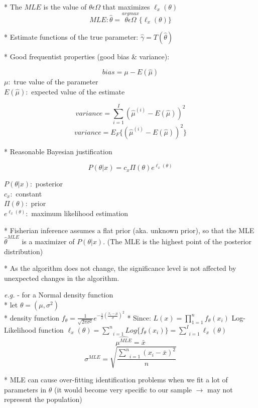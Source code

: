 \documentclass[10pt,landscape]{article}
\begin{document}
\begin{multicols}{3}
* The $MLE$ is the value of $\theta \epsilon \Omega$ that maximizes $\ell_x(\theta)$
$$ MLE:\hat{\theta} = \overset{argmax}{\theta \epsilon \Omega}\{\ell_x(\theta)\}$$

* Estimate functions of the true parameter: $\hat{\gamma} = T(\hat{\theta})$

* Good frequentist properties (good bias \& variance):
\begin{multicols}{2}
$$bias = \mu - E(\hat{\mu})$$
$\mu:$ true value of the parameter \\
$E(\hat{\mu}):$ expected value of the estimate

\pagebreak 
$$variance = \underset{i=1}{\overset{I}{\sum}} ({\hat{\mu}}^{(i)} - E(\hat{\mu}))^2$$
$$variance = E_F\{({\hat{\mu}}^{(i)} - E(\hat{\mu}))^2\}$$
\end{multicols}

* Reasonable Bayesian justification
\begin{multicols}{2}
$$ P(\theta | x) = c_x \Pi(\theta) e^{\ell_x(\theta)} $$

\pagebreak 
$P(\theta | x):$ posterior \\
$c_x:$ constant \\
$\Pi(\theta):$ prior \\
$e^{\ell_x(\theta)}:$ maximum likelihood estimation
\end{multicols}

* Fisherian inference assumes a flat prior (aka. unknown prior), so that the MLE $\hat{\theta}^{MLE}$ is a maximizer of $P(\theta | x)$. (The MLE is the highest point of the posterior distribution)

* As the algorithm does not change, the significance level is not affected by unexpected changes in the algorithm.

\medskip 
\emph{e.g.} - for a Normal density function\\
* let $\theta = (\mu, \sigma^2)$ \\
* density function $f_{\theta} = \frac{1}{\sqrt{2 \pi \sigma^2}} e^{-\frac{1}{2} \left(\frac{x_i - \mu}{\sigma}\right)^2}$
* Since: $L(x) = \prod _{1=1}^n f_{\theta}(x_i)$
Log-Likelihood function $\ell_x(\theta) = \underset{i=1}{\overset{n}{\sum}} Log\{f_{\theta}(x_i)\} = \underset{i=1}{\overset{I}{\sum}} \ell_x(\theta)$
$$ \hat{\mu^{MLE}} = \bar{x} $$
$$ \sigma^{MLE} = \sqrt{\frac{\underset{i=1}{\overset{n}{\sum}} (x_i - \bar{x})^2}{n}} $$

* MLE can cause over-fitting identification problems when we fit a lot of parameters in $\theta$ (it would become very specific to our sample $\rightarrow$ may not represent the population)

\end{multicols}
\end{document}
